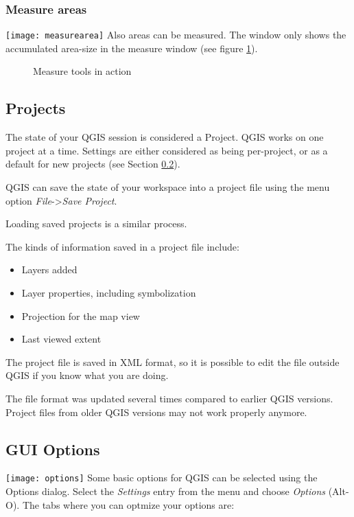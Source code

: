 \subsubsection{Measure areas}
\texttt{[image: measurearea]} Also areas can be measured. The window only shows the
accumulated area-size in the measure window (see figure \ref{fig:measure}).

\begin{figure}[h]
\caption{Measure tools in action} \label{fig:measure}
\centering
   \goodgap
\end{figure}

\subsection{Projects}\label{sec:projects}

The state of your QGIS session is considered a Project.  QGIS
works on one project at a time.  Settings are either considered
as being per-project, or as a default for new projects (see
Section \ref{subsec:gui_options}).

QGIS can save the state of your workspace into a project file using
the menu option \textit{File}->\textit{Save Project}.

Loading saved projects is a similar process.

The kinds of information saved in a project file include:

\begin{itemize}
\item Layers added
\item Layer properties, including symbolization
\item Projection for the map view
\item Last viewed extent
\end{itemize}

The project file is saved in XML format, so it is possible to edit
the file outside QGIS if you know what you are doing.  

The file format was updated several times compared to earlier QGIS versions. Project files 
from older QGIS versions may not work properly anymore.

\subsection{GUI Options}
\label{subsec:gui_options}
\texttt{[image: options]} Some basic options for QGIS
can be selected using the Options dialog. Select the \textsl{Settings} entry
from the menu and choose \textsl{Options} (Alt-O). The tabs where you can 
optmize your options are:

